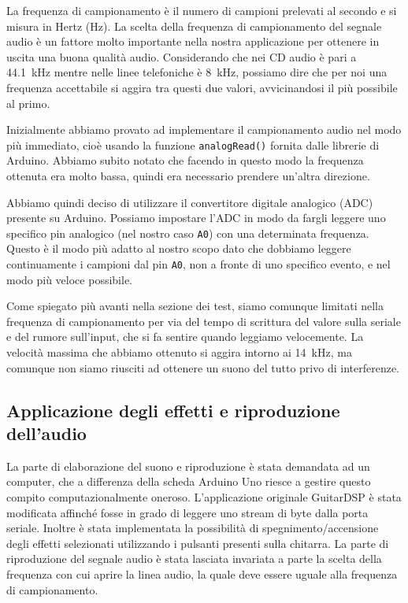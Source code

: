 \documentclass[a4paper,11pt]{article}
\begin{document}
La frequenza di campionamento è il numero di campioni prelevati al secondo e si misura in Hertz (\si{\hertz}).
La scelta della frequenza di campionamento del segnale audio è un fattore molto importante nella nostra applicazione per ottenere in uscita una buona qualità audio. Considerando che nei CD audio è pari a \SI{44.1}{\kilo\hertz} mentre nelle linee telefoniche è \SI{8}{\kilo\hertz}, possiamo dire che per noi una frequenza accettabile si aggira tra questi due valori, avvicinandosi il più possibile al primo.

Inizialmente abbiamo provato ad implementare il campionamento audio nel modo più immediato, cioè usando la funzione \texttt{analogRead()} fornita dalle librerie di Arduino. Abbiamo subito notato che facendo in questo modo la frequenza ottenuta era molto bassa, quindi era necessario prendere un'altra direzione.

Abbiamo quindi deciso di utilizzare il convertitore digitale analogico (ADC) presente su Arduino. Possiamo impostare l'ADC in modo da fargli leggere uno specifico pin analogico (nel nostro caso \texttt{A0}) con una determinata frequenza. Questo è il modo più adatto al nostro scopo dato che dobbiamo leggere continuamente i campioni dal pin \texttt{A0}, non a fronte di uno specifico evento, e nel modo più veloce possibile.

Come spiegato più avanti nella sezione dei test, siamo comunque limitati nella frequenza di campionamento per via del tempo di scrittura del valore sulla seriale e del rumore sull'input, che si fa sentire quando leggiamo velocemente. La velocità massima che abbiamo ottenuto si aggira intorno ai \SI{14}{\kilo\hertz}, ma comunque non siamo riusciti ad ottenere un suono del tutto privo di interferenze.

\subsection{Applicazione degli effetti e riproduzione dell'audio}
La parte di elaborazione del suono e riproduzione è stata demandata ad un computer, che a differenza della scheda Arduino Uno riesce a gestire questo compito computazionalmente oneroso. L'applicazione originale GuitarDSP è stata modificata affinché fosse in grado di leggere uno stream di byte dalla porta seriale. Inoltre è stata implementata la possibilità di spegnimento/accensione degli effetti selezionati utilizzando i pulsanti presenti sulla chitarra. La parte di riproduzione del segnale audio è stata lasciata invariata a parte la scelta della frequenza con cui aprire la linea audio, la quale deve essere uguale alla frequenza di campionamento.
\end{document}
